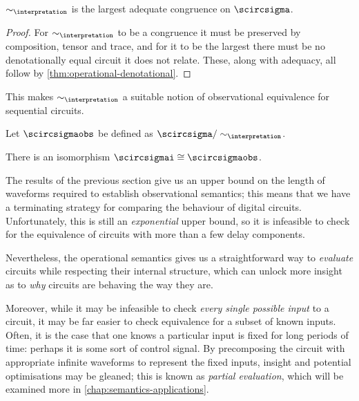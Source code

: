 \begin{corollary}
    \(\sim_\interpretation\) is the largest adequate congruence on
    \(\scircsigma\).
\end{corollary}
\begin{proof}
    For \(\sim_\interpretation\) to be a congruence it must be preserved by
    composition, tensor and trace, and for it to be the largest there must be
    no denotationally equal circuit it does not relate.
    These, along with adequacy, all follow by
    \cref{thm:operational-denotational}.
\end{proof}

This makes \(\sim_\interpretation\) a suitable notion of observational
equivalence for sequential circuits.

\begin{definition}
    Let \(\scircsigmaobs\) be defined as
    \(\scircsigma / \sim_{\interpretation}\).
\end{definition}

\begin{corollary}
    There is an isomorphism \(\scircsigmai \cong \scircsigmaobs\).
\end{corollary}

The results of the previous section give us an upper bound on the length of
waveforms required to establish observational semantics; this means that we have
a terminating strategy for comparing the behaviour of digital circuits.
Unfortunately, this is still an \emph{exponential} upper bound, so it is
infeasible to check for the equivalence of circuits with more than a few delay
components.

Nevertheless, the operational semantics gives us a straightforward way to
\emph{evaluate} circuits while respecting their internal structure, which can
unlock more insight as to \emph{why} circuits are behaving the way they
are.

Moreover, while it may be infeasible to check \emph{every single possible input}
to a circuit, it may be far easier to check equivalence for a subset of known
inputs.
Often, it is the case that one knows a particular input is fixed for long
periods of time: perhaps it is some sort of control signal.
By precomposing the circuit with appropriate infinite waveforms to represent the
fixed inputs, insight and potential optimisations may be gleaned; this is known
as \emph{partial evaluation}, which will be examined more
in \cref{chap:semantics-applications}.